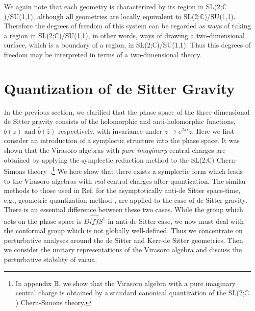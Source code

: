 \documentclass[a4paper,11pt]{article}
\begin{document}
We again note that each geometry is characterized by its region in 
SL(2;$\mathbb{C}$)/SU(1,1), although all geometries are locally 
equivalent to SL(2;$\mathbb{C}$)/SU(1,1). 
Therefore the degrees of freedom of this system can be regarded as 
ways of taking a region in SL(2;$\mathbb{C}$)/SU(1,1), in other words, 
ways of drawing a two-dimensional surface, which is a boundary of 
a region, in SL(2;$\mathbb{C}$)/SU(1,1).
Thus this degrees of freedom may be interpreted in terms of
a two-dimensional theory.


\section{Quantization of de Sitter Gravity}
In the previous section, we clarified that the phase space  
of the three-dimensional de Sitter gravity consists of the holomorphic 
and anti-holomorphic functions, 
$b(z)$ and $\bar{b}(\bar{z})$ respectively, with invariance 
under $z\rightarrow e^{2\pi i}z$.
Here we first consider an introduction of a symplectic structure 
into the phase space.
It was shown that the Virasoro algebras with {\it pure imaginary} 
central charges are obtained by applying the symplectic reduction method 
to the SL(2;$\mathbb{C}$) Chern-Simons theory~\cite{Park}.\footnote{
In appendix B, we show that the Virasoro algebra with a pure imaginary central
charge is obtained by a standard canonical quantization of 
the SL(2;$\mathbb{C}$)
Chern-Simons theory.}
We here show that there exists a symplectic form which leads to 
the Virasoro algebras with {\it real} central charges after
quantization.
The similar methods to those used in Ref.\cite{NUY} for the asymptotically 
anti-de Sitter space-time, 
e.g., geometric quantization method \cite{Segal, B-R, Witten3, Woodhouse}, 
are applied to the case of de Sitter gravity.
There is an essential difference between these two cases.
While the group which acts on the phase space is $\widehat{Dif\! f S^1}$ 
in anti-de Sitter case, we now must deal with 
the conformal group which is not globally well-defined.
Thus we concentrate on perturbative analyses around the de Sitter and 
Kerr-de Sitter geometries.
Then we consider the unitary representations of the Virasoro algebra 
and discuss the perturbative stability of vacua. 
\end{document}
